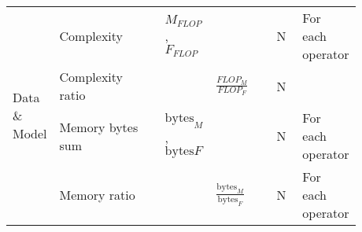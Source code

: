 \begin{tabular}{lp{0.35\linewidth}p{0.10\linewidth}>{\footnotesize}p{0.2\linewidth}p{0.08\linewidth}p{0.15\linewidth}}
  \multirow[t]{4}{*}{Data \& Model}      & Complexity                              & $M_{FLOP}$, $F_{FLOP}$            &                                         & N    & For each operator                    \\
                                         & Complexity ratio                        &                                   & $\frac{FLOP_M}{FLOP_F}$                 & N    &                                      \\
                                         & Memory bytes sum                        & $\text{bytes}_M$, $\text{bytes}F$ &                                         & N    & For each operator                    \\
                                         & Memory ratio                            &                                   & $\frac{\text{bytes}_M}{\text{bytes}_F}$ & N    & For each operator                    \\


\end{tabular}
